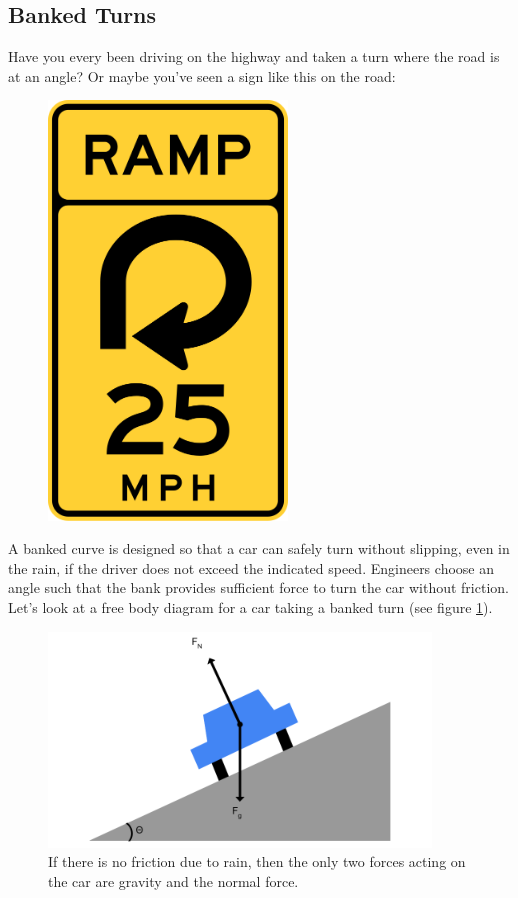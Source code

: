 \subsection{Banked Turns}
Have you every been driving on the highway and taken a turn where the road is at an angle? Or maybe you've seen a sign like this on the road:

\begin{figure}
\includegraphics[width=2.5in]{traffic.png}
\end{figure}

A banked curve is designed so that a car can safely turn without slipping, even in the rain, if the driver does not exceed the indicated speed. Engineers choose an angle such that the bank provides sufficient force to turn the car without friction. Let's look at a free body diagram for a car taking a banked turn (see figure \ref{fig:banked}). 
\vspace{4cm} %
\begin{figure}[htbp]
    \centering
    \includegraphics[width=4in]{banked.png}
    \caption{If there is no friction due to rain, then the only two forces acting on the car are gravity and the normal force.}
    \label{fig:banked}
\end{figure}

